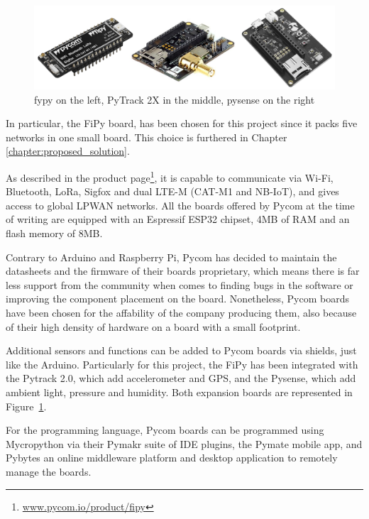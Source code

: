 			\begin{figure}
				\centering
				\includegraphics[width=\textwidth]{resources/img/chap3/pycom_board}
				\caption{fypy on the left, PyTrack 2X in the middle, pysense on the right}
				\label{img:pycom_board}
			\end{figure}	
			
			In particular, the FiPy board, has been chosen for this project since it packs five networks in one small board.
			This choice is furthered in Chapter \ref{chapter:proposed_solution}.
			
			As described in the product page\footnote{ \url{www.pycom.io/product/fipy}}, it is capable to communicate via Wi-Fi, Bluetooth, LoRa, Sigfox and dual LTE-M (CAT-M1 and NB-IoT), and gives access to global LPWAN networks.
			All the boards offered by Pycom at the time of writing are equipped with an Espressif ESP32 chipset, 4MB of RAM and an flash memory of 8MB.
			
			Contrary to Arduino and Raspberry Pi, Pycom has decided to maintain the datasheets and the firmware of their boards proprietary, which means there is far less support from the community when comes to finding bugs in the software or improving the component placement on the board.
			Nonetheless, Pycom boards have been chosen for the affability of the company producing them, also because of their high density of hardware on a board with a small footprint.
			
			Additional sensors and functions can be added to Pycom boards via shields, just like the Arduino.
			Particularly for this project, the FiPy has been integrated with the Pytrack 2.0, which add accelerometer and GPS, and the Pysense, which add ambient light, pressure and humidity.
			Both expansion boards are represented in Figure~\ref{img:pycom_board}.
					
			For the programming language, Pycom boards can be programmed using Mycropython via their Pymakr suite of IDE plugins, the Pymate mobile app, and Pybytes an online middleware platform and desktop application to remotely manage the boards.
			
